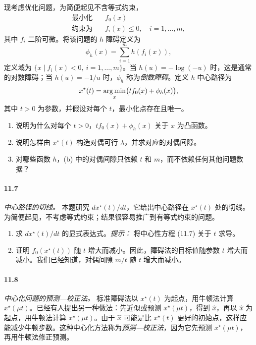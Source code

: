 现考虑优化问题，为简便起见不含等式约束，
\[
\begin{aligned}\text{最小化}\quad&f_0(x)\\\text{约束为}\quad&f_i(x)\le0,\quad i=1,\ldots,m,\end{aligned}
\]
其中 $f_i$ 二阶可微。将该问题的 $h$ 障碍定义为
\[
\phi_h(x)=\sum_{i=1}^m h(f_i(x)),
\]
定义域为 $\{x\mid f_i(x)<0,\ i=1,\ldots,m\}$。当 $h(u)=-\log(-u)$ 时，这是通常的对数障碍；当 $h(u)=-1/u$ 时，$\phi_h$ 称为\emph{倒数障碍}。定义 $h$ 中心路径为
\[
x^\star(t)=\operatorname*{arg\,min}_x\bigl(tf_0(x)+\phi_h(x)\bigr),
\]
其中 $t>0$ 为参数，并假设对每个 $t$，最小化点存在且唯一。
\begin{enumerate}
\item[(a)] 说明为什么对每个 $t>0$，$tf_0(x)+\phi_h(x)$ 关于 $x$ 为凸函数。
\item[(b)] 说明怎样由 $x^\star(t)$ 构造对偶可行 $\lambda$，并求对应的对偶间隙。
\item[(c)] 对哪些函数 $h$，(b) 中的对偶间隙只依赖 $t$ 和 $m$，而不依赖任何其他问题数据？
\end{enumerate}

\paragraph{11.7} \emph{中心路径的切线。} 本题研究 $dx^\star(t)/dt$，它给出中心路径在 $x^\star(t)$ 处的切线。为简便起见，不考虑等式约束；结果很容易推广到有等式约束的问题。
\begin{enumerate}
\item[(a)] 求 $dx^\star(t)/dt$ 的显式表达式。\emph{提示：} 将中心性方程 (11.7) 关于 $t$ 求导。
\item[(b)] 证明 $f_0(x^\star(t))$ 随 $t$ 增大而减小。因此，障碍法的目标值随参数 $t$ 增大而减小。我们已经知道，对偶间隙 $m/t$ 随 $t$ 增大而减小。
\end{enumerate}

\paragraph{11.8} \emph{中心化问题的预测—校正法。} 标准障碍法以 $x^\star(t)$ 为起点，用牛顿法计算 $x^\star(\mu t)$。已经有人提出另一种做法：先近似或预测 $x^\star(\mu t)$，得到 $\widehat x$，再以 $\widehat x$ 为起点，用牛顿法计算 $x^\star(\mu t)$。由于 $\widehat x$ 可能是比 $x^\star(t)$ 更好的初始点，这样应能减少牛顿步数。这种中心化方法称为\emph{预测—校正法}，因为它先预测 $x^\star(\mu t)$，再用牛顿法修正预测。


